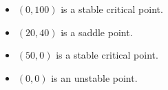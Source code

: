 \documentclass{article}
\begin{document}
\setcounter{subsubsection}{10}
\subsubsection{}

\begin{itemize}
  \item $(0, 100)$ is a stable critical point.

  \item $(20, 40)$ is a saddle point.

  \item $(50, 0)$ is a stable critical point.

  \item $(0, 0)$ is an unstable point.
\end{itemize}

\setcounter{subsubsection}{16}
\subsubsection{}
\end{document}
